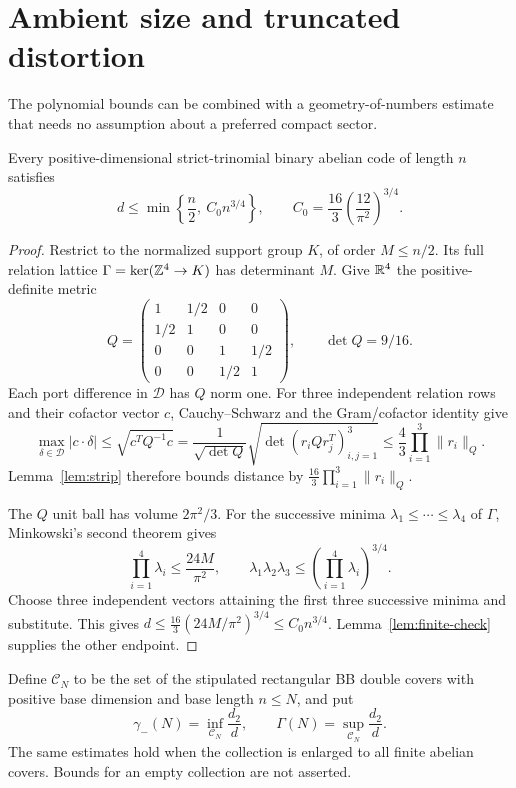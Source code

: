 \section{Ambient size and truncated distortion}
\label{sec:size}
The polynomial bounds can be combined with a geometry-of-numbers estimate that needs no assumption about a preferred compact sector.

\begin{theorem}\label{thm:ambient}
Every positive-dimensional strict-trinomial binary abelian code of length $n$ satisfies
\begin{equation}\label{eq:ambient}
 d\le\min\left\{\frac n2,\ C_0n^{3/4}\right\},\qquad
 C_0=\frac{16}{3}\left(\frac{12}{\pi^2}\right)^{3/4}.
\end{equation}
\end{theorem}
\begin{proof}
Restrict to the normalized support group $K$, of order $M\le n/2$. Its full relation lattice $\Gamma=\ker(\mathbb Z^4\to K)$ has determinant $M$. Give $\mathbb R^4$ the positive-definite metric
\[
 Q=\begin{pmatrix}
 1&1/2&0&0\\1/2&1&0&0\\0&0&1&1/2\\0&0&1/2&1
 \end{pmatrix},\qquad\det Q=9/16.
\]
Each port difference in $\mathcal D$ has $Q$ norm one. For three independent relation rows and their cofactor vector $c$, Cauchy--Schwarz and the Gram/cofactor identity give
\[
 \max_{\delta\in\mathcal D}|c\cdot\delta|
 \le\sqrt{c^TQ^{-1}c}
 =\frac1{\sqrt{\det Q}}\sqrt{\det(r_iQr_j^T)_{i,j=1}^3}
 \le\frac43\prod_{i=1}^3\|r_i\|_Q.
\]
Lemma~\ref{lem:strip} therefore bounds distance by $\frac{16}{3}\prod_{i=1}^3\|r_i\|_Q$.

The $Q$ unit ball has volume $2\pi^2/3$. For the successive minima $\lambda_1\le\cdots\le\lambda_4$ of $\Gamma$, Minkowski's second theorem \cite[Chapter VIII]{Cassels} gives
\[
 \prod_{i=1}^4\lambda_i\le\frac{24M}{\pi^2},\qquad
 \lambda_1\lambda_2\lambda_3
 \le\left(\prod_{i=1}^4\lambda_i\right)^{3/4}.
\]
Choose three independent vectors attaining the first three successive minima and substitute. This gives $d\le\frac{16}{3}(24M/\pi^2)^{3/4}\le C_0n^{3/4}$. Lemma~\ref{lem:finite-check} supplies the other endpoint.
\end{proof}

Define $\mathcal C_N$ to be the set of the stipulated rectangular BB double covers with positive base dimension and base length $n\le N$, and put
\[
 \gamma_-(N)=\inf_{\mathcal C_N}\frac{d_2}{d},\qquad
 \Gamma(N)=\sup_{\mathcal C_N}\frac{d_2}{d}.
\]
The same estimates hold when the collection is enlarged to all finite abelian covers. Bounds for an empty collection are not asserted.


